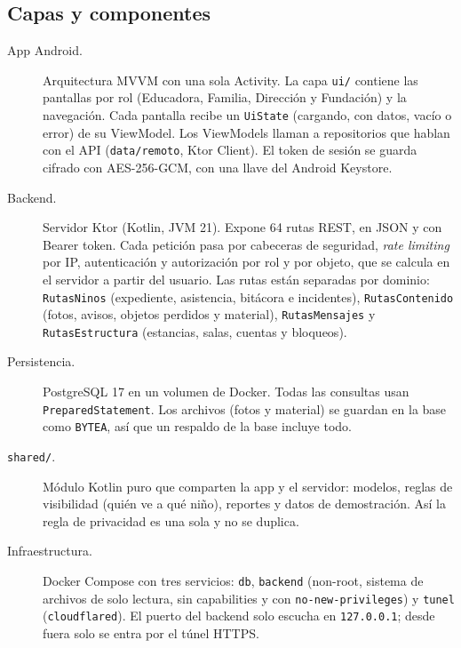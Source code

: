 \subsection{Capas y componentes}
\begin{description}
	\item[App Android.] Arquitectura MVVM con una sola Activity. La capa \texttt{ui/\allowbreak{}} contiene las pantallas por rol (Educadora, Familia, Dirección y Fundación) y la navegación. Cada pantalla recibe un \texttt{Ui\allowbreak{}State} (cargando, con datos, vacío o error) de su ViewModel. Los ViewModels llaman a repositorios que hablan con el API (\texttt{data/\allowbreak{}remoto}, Ktor Client). El token de sesión se guarda cifrado con AES-256-GCM, con una llave del Android Keystore.
	\item[Backend.] Servidor Ktor (Kotlin, JVM 21). Expone 64 rutas REST, en JSON y con Bearer token. Cada petición pasa por cabeceras de seguridad, \emph{rate limiting} por IP, autenticación y autorización por rol y por objeto, que se calcula en el servidor a partir del usuario. Las rutas están separadas por dominio: \texttt{Rutas\allowbreak{}Ninos} (expediente, asistencia, bitácora e incidentes), \texttt{Rutas\allowbreak{}Contenido} (fotos, avisos, objetos perdidos y material), \texttt{Rutas\allowbreak{}Mensajes} y \texttt{Rutas\allowbreak{}Estructura} (estancias, salas, cuentas y bloqueos).
	\item[Persistencia.] PostgreSQL 17 en un volumen de Docker. Todas las consultas usan \texttt{Prepared\allowbreak{}Statement}. Los archivos (fotos y material) se guardan en la base como \texttt{BYTEA}, así que un respaldo de la base incluye todo.
	\item[\texttt{shared/\allowbreak{}}.] Módulo Kotlin puro que comparten la app y el servidor: modelos, reglas de visibilidad (quién ve a qué niño), reportes y datos de demostración. Así la regla de privacidad es una sola y no se duplica.
	\item[Infraestructura.] Docker Compose con tres servicios: \texttt{db}, \texttt{backend} (non-root, sistema de archivos de solo lectura, sin capabilities y con \texttt{no-new-privileges}) y \texttt{tunel} (\texttt{cloudflared}). El puerto del backend solo escucha en \texttt{127.\allowbreak{}0.\allowbreak{}0.\allowbreak{}1}; desde fuera solo se entra por el túnel HTTPS.
\end{description}

